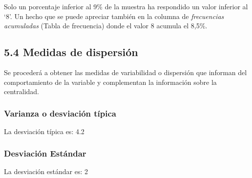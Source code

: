 \documentclass[
  12 pt,
  a4paper,
]{article}
\newenvironment{Shaded}{\begin{snugshade}}{\end{snugshade}}
\newcommand{\AttributeTok}[1]{\textcolor[rgb]{0.13,0.29,0.53}{#1}}
\newcommand{\CommentTok}[1]{\textcolor[rgb]{0.56,0.35,0.01}{\textit{#1}}}
\newcommand{\ConstantTok}[1]{\textcolor[rgb]{0.56,0.35,0.01}{#1}}
\newcommand{\FunctionTok}[1]{\textcolor[rgb]{0.13,0.29,0.53}{\textbf{#1}}}
\newcommand{\NormalTok}[1]{#1}
\newcommand{\OtherTok}[1]{\textcolor[rgb]{0.56,0.35,0.01}{#1}}
\newcommand{\SpecialCharTok}[1]{\textcolor[rgb]{0.81,0.36,0.00}{\textbf{#1}}}
\begin{document}
Solo un porcentaje inferior al 9\% de la muestra ha respondido un valor
inferior al `8'. Un hecho que se puede apreciar también en la columna de
\emph{frecuencias acumuladas} (Tabla de frecuencia) donde el valor 8
acumula el 8,5\%.

\hypertarget{medidas-de-dispersiuxf3n}{%
\subsection{5.4 Medidas de dispersión}\label{medidas-de-dispersiuxf3n}}

Se procederá a obtener las medidas de variabilidad o dispersión que
informan del comportamiento de la variable y complementan la información
sobre la centralidad.

\hypertarget{varianza-o-desviaciuxf3n-tuxedpica}{%
\subsubsection{Varianza o desviación
típica}\label{varianza-o-desviaciuxf3n-tuxedpica}}

\begin{Shaded}
\end{Shaded}

La desviación típica es: 4.2

\hypertarget{desviaciuxf3n-estuxe1ndar}{%
\subsubsection{Desviación Estándar}\label{desviaciuxf3n-estuxe1ndar}}

\begin{Shaded}
\end{Shaded}

La desviación estándar es: 2
\end{document}
